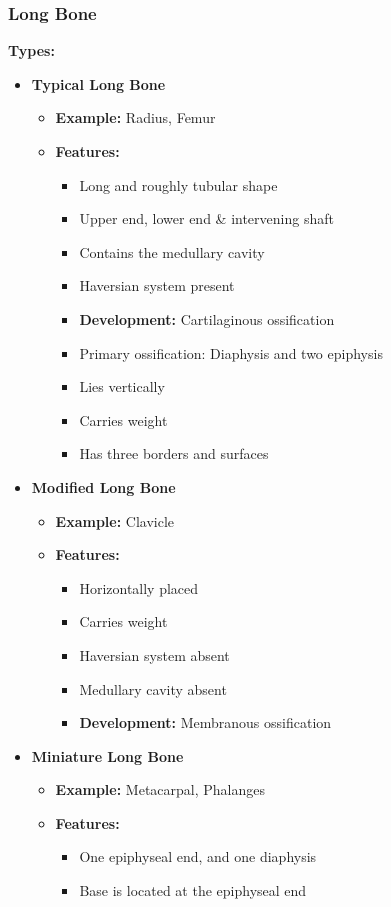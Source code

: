\documentclass[11pt]{article}
\begin{document}
\subsubsection*{Long Bone}
\textbf{Types:}
\begin{itemize}
    \item \textbf{Typical Long Bone}
    \begin{itemize}
        \item \textbf{Example:} Radius, Femur
        \item \textbf{Features:}
        \begin{itemize}
            \item Long and roughly tubular shape
            \item Upper end, lower end \& intervening shaft
            \item Contains the medullary cavity
            \item Haversian system present
            \item \textbf{Development:} Cartilaginous ossification
            \item Primary ossification: Diaphysis and two epiphysis
            \item Lies vertically
            \item Carries weight
            \item Has three borders and surfaces
        \end{itemize}
    \end{itemize}
    
    \item \textbf{Modified Long Bone}
    \begin{itemize}
        \item \textbf{Example:} Clavicle
        \item \textbf{Features:}
        \begin{itemize}
            \item Horizontally placed
            \item Carries weight
            \item Haversian system absent
            \item Medullary cavity absent
            \item \textbf{Development:} Membranous ossification
        \end{itemize}
    \end{itemize}
    
    \item \textbf{Miniature Long Bone}
    \begin{itemize}
        \item \textbf{Example:} Metacarpal, Phalanges
        \item \textbf{Features:}
        \begin{itemize}
            \item One epiphyseal end, and one diaphysis
            \item Base is located at the epiphyseal end
        \end{itemize}
    \end{itemize}
\end{itemize}
\end{document}
